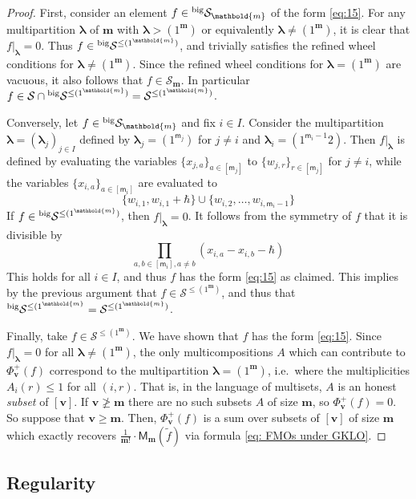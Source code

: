 \documentclass[11pt,reqno]{amsart}
\renewcommand{\mathbf}{\mathbold}
\numberwithin{equation}{section}
\theoremstyle{definition}
\newcommand{\cS}{\mathcal{S}}
\newcommand{\bm}{\mathbf{m}}
\newcommand{\bv}{\mathbf{v}}
\renewcommand{\tilde}[1]{\widetilde{#1}}
\newcommand{\leftexp}[2]{\vphantom{#2}^{#1} #2}
\renewcommand{\bv}{\mathbf{v}} %
\newcommand{\sm}{\mathsf{m}}
\newcommand{\M}{\mathsf{M}}
\newcommand{\vertexset}{I}
\newcommand{\bla}{{\boldsymbol{\lambda}}}
\newcommand{\shu}{\cS}
\newcommand{\preshu}{\leftexp{\mathrm{big}}{\cS}}
\begin{document}
\begin{proof}
    First, consider an element $f \in \preshu_\bm$  of the form \eqref{eq:15}.  For any multipartition $\bla$ of $\bm$ with $\bla > (1^\bm)$ or equivalently $\bla \neq (1^\bm)$, it is clear that $f|_\bla = 0$. Thus $f \in \preshu^{\leq (1^\bm)}$, and trivially satisfies the refined wheel conditions for $\bla\neq (1^\bm)$.  Since the refined wheel conditions for $\bla =(1^\bm)$ are vacuous, it also follows  that $f \in \shu_\bm$.  In particular $f \in \shu \cap \preshu^{\leq (1^\bm)} = \shu^{\leq (1^\bm)}$.

    Conversely, let $f \in \preshu_\bm$ and fix $i \in \vertexset$. Consider the multipartition $\bla = (\bla_j)_{j \in \vertexset}$ defined by $\bla_j = (1^{\sm_j})$ for $j \neq i$ and $\bla_i = (1^{\sm_i-1} 2)$.  Then $f|_\bla$ is defined by evaluating the variables $\{x_{j,a}\}_{a \in [\sm_j]}$ to $\{w_{j,r}\}_{r \in [\sm_j]}$ for $j \neq i$, while the variables $\{x_{i,a}\}_{a \in [\sm_i]}$ are evaluated to 
    $$
    \{ w_{i,1}, w_{i,1}+\hbar\} \cup \{w_{i,2},\ldots, w_{i,\sm_i-1}\}
    $$
    If $f \in \preshu^{\leq (1^\bm)}$, then $f|_\bla = 0$.  It follows from the symmetry of $f$ that it is divisible by 
    $$
    \prod_{a, b \in [\sm_i], a\neq b} (x_{i,a} - x_{i,b} - \hbar)
    $$
    This holds for all $i\in\vertexset$, and thus $f$ has the form \eqref{eq:15} as claimed. This implies by the previous argument that  $f \in \shu^{\leq (1^\bm)}$, and thus that $\preshu^{\leq (1^\bm} = \shu^{\leq (1^\bm)}$.

    Finally, take $f \in \shu^{\leq (1^\bm)}$. We have shown that $f$ has the form \eqref{eq:15}.  Since $f|_{\bla} = 0$ for all $\bla \neq (1^\bm)$, the only multicompositions $A$ which can contribute to $\Phi^+_\bv(f)$ correspond to the multipartition $\bla = (1^\bm)$, i.e.~where the multiplicities $A_i(r) \leq 1$ for all $(i,r)$. That is, in the language of multisets, $A$ is an honest \emph{subset} of $[\bv]$. If $\bv \not\geq \bm$ there are no such subsets $A$ of size $\bm$, so $\Phi^+_\bv(f) = 0$.  So suppose that $\bv \geq \bm$. Then, $\Phi^+_{\bv}(f)$ is a sum over subsets of $[\bv]$ of size $\bm$ which exactly recovers $ \frac{1}{\bm!} \cdot \M_{\bm}(\tilde{f})$ via formula \eqref{eq: FMOs under GKLO}.

\end{proof}

\subsection{Regularity}
\end{document}
